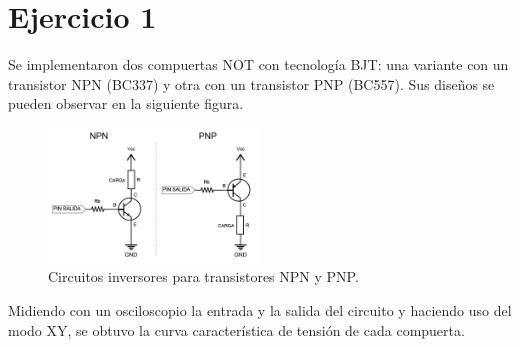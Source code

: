 \part*{Ejercicio 1}


Se implementaron dos compuertas NOT con tecnología BJT: una variante con un transistor NPN (BC337) y otra con un transistor PNP (BC557). Sus diseños se pueden observar en la siguiente figura.


\begin{figure}[H]
  \centering
    \includegraphics[width=0.5\textwidth]{ejercicio1/circuitos.png}
    \caption{Circuitos inversores para transistores NPN y PNP.}
\end{figure}

Midiendo con un osciloscopio la entrada y la salida del circuito y haciendo uso del modo XY, se obtuvo la curva caracter\'istica de tensi\'on de cada compuerta.

